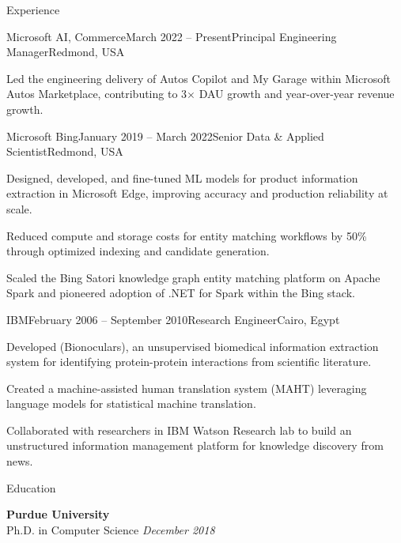 \documentclass{resume}
\begin{document}
\begin{rSection}{Experience}
\begin{rSubsection}{Microsoft AI, Commerce}{March 2022 -- Present}{Principal Engineering Manager}{Redmond, USA}
\item Led the engineering delivery of Autos Copilot and My Garage within Microsoft Autos Marketplace, contributing to 3$\times$ DAU growth and year-over-year revenue growth.

\end{rSubsection}

\begin{rSubsection}{Microsoft Bing}{January 2019 -- March 2022}{Senior Data \& Applied Scientist}{Redmond, USA}

\item Designed, developed, and fine-tuned ML models for product information extraction in Microsoft Edge, improving accuracy and production reliability at scale.

\item Reduced compute and storage costs for entity matching workflows by 50\% through optimized indexing and candidate generation.

\item Scaled the Bing Satori knowledge graph entity matching platform on Apache Spark and pioneered adoption of .NET for Spark within the Bing stack.

\end{rSubsection}

\begin{rSubsection}{IBM}{February 2006 -- September 2010}{Research Engineer}{Cairo, Egypt}

\item Developed (Bionoculars), an unsupervised biomedical information extraction system for identifying protein-protein interactions from scientific literature.

\item Created a machine-assisted human translation system (MAHT) leveraging language models for statistical machine translation.

\item Collaborated with researchers in IBM Watson Research lab to build an unstructured information management platform for knowledge discovery from news.

\end{rSubsection}

\end{rSection}

\begin{rSection}{Education}

{\bf Purdue University} \\
Ph.D. in Computer Science \hfill {\em December 2018}

\end{rSection}
\end{document}
